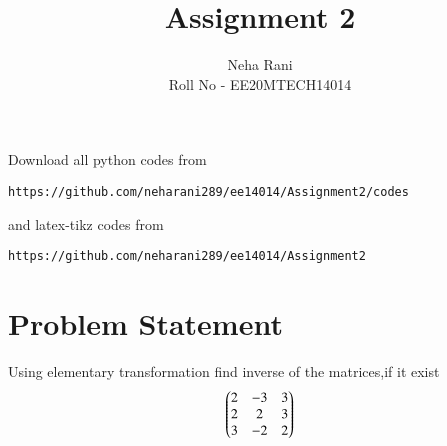 \documentclass[journal,12pt,twocolumn]{IEEEtran}
\begin{document}
	\def\rightbox#1{\makebox[0in][r]{#1}}
	\def\centbox#1{\makebox[0in]{#1}}
	\def\topbox#1{\raisebox{-\baselineskip}[0in][0in]{#1}}
	\def\midbox#1{\raisebox{-0.5\baselineskip}[0in][0in]{#1}}
	\vspace{3cm}
\title{Assignment 2}
\author{Neha Rani \\Roll No - EE20MTECH14014}
\maketitle
\newpage
\bigskip
\renewcommand{\thefigure}{\theenumi}
\renewcommand{\thetable}{\theenumi}
Download all python codes from 
\begin{lstlisting}
https://github.com/neharani289/ee14014/Assignment2/codes
\end{lstlisting}
%
and latex-tikz codes from 
%
\begin{lstlisting}
https://github.com/neharani289/ee14014/Assignment2
\end{lstlisting}
%
\section{\textbf{Problem Statement}}
Using elementary transformation find inverse of the matrices,if it exist
\begin{align}
\begin{pmatrix}2 & -3 & 3\\ 2 & 2 & 3\\ 3 & -2 & 2\end{pmatrix}
\end{align}
	
\end{document}
